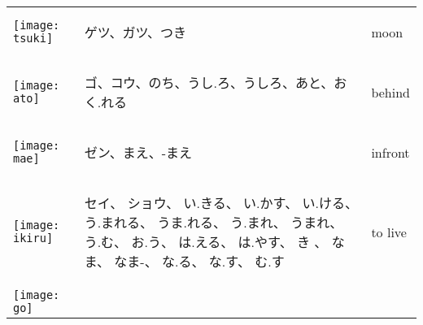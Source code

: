 \documentclass[a4paper,12pt]{extarticle}
\begin{document}
\begin{longtable}{|lp{6cm}p{4cm}|}
\begin{minipage}{0.3\textwidth}
		\centerline{
			\texttt{[image: tsuki]}
		}
	\end{minipage}
	                                   &
	\begin{CJK}{UTF8}{min}ゲツ、ガツ、つき\end{CJK}
	                                   &
	moon
	\\
	\begin{minipage}{0.3\textwidth}
		\centerline{
			\texttt{[image: ato]}
		}
	\end{minipage}
	                                   &
	\begin{CJK}{UTF8}{min}ゴ、コウ、のち、うし.ろ、うしろ、あと、おく.れる\end{CJK}
	                                   &
	behind
	\\
	\begin{minipage}{0.3\textwidth}
		\centerline{
			\texttt{[image: mae]}
		}
	\end{minipage}
	                                   &
	\begin{CJK}{UTF8}{min}ゼン、まえ、-まえ\end{CJK}
	                                   &
	infront
	\\
	\begin{minipage}{0.3\textwidth}
		\centerline{
			\texttt{[image: ikiru]}
		}
	\end{minipage}
	                                   &
	\begin{CJK}{UTF8}{min} セイ、 ショウ、 い.きる、 い.かす、 い.ける、 う.まれる、 うま.れる、 う.まれ、 うまれ、 う.む、 お.う、 は.える、 は.やす、 き 、 なま、 なま-、 な.る、 な.す、 む.す\end{CJK}
	                                   &
	to live
	\\
	\begin{minipage}{0.3\textwidth}
		\centerline{
			\texttt{[image: go]}
}
\end{minipage}
\end{longtable}
\end{document}
